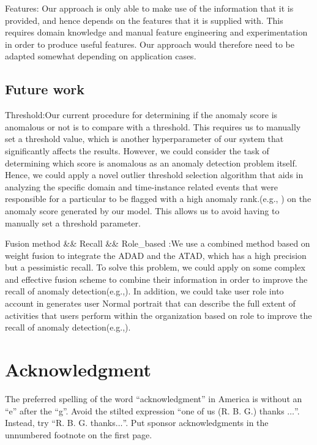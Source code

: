 \documentclass[conference]{IEEEtran}
\begin{document}
Features: Our approach is only able to make use of the information that it is provided, and hence depends on the features that it is supplied with. This requires domain knowledge and manual feature engineering and experimentation in order to produce useful features. Our approach would therefore need to be adapted somewhat depending on application cases.


\subsection{Future work} 
Threshold:Our current procedure for determining if the anomaly score is anomalous or not is to compare with a threshold. This requires us to manually set a threshold value, which is another hyperparameter of our system that significantly affects the results. However, we could consider the task of determining which score is anomalous as an anomaly detection problem itself. Hence, we could apply a novel outlier threshold selection algorithm that aids in analyzing the specific domain and time-instance related events that were responsible for a particular to be flagged with a high anomaly rank.(e.g., \cite{b49}) on the anomaly score generated by our model. This allows us to avoid having to manually set a threshold parameter.

Fusion method \&\& Recall \&\& Role\_based	:We use a combined method based on weight fusion to integrate the ADAD and the ATAD, which has a high precision but a pessimistic recall. To solve this problem, we could apply on some complex and effective fusion scheme to combine their information in order to improve the recall of anomaly detection(e.g.,\cite{b49}).  In addition, we could take user role into account in generates user Normal portrait that can describe the full extent of activities that users perform within the organization based on role to improve the recall of anomaly detection(e.g.,\cite{b50}).   	
\fi

\section*{Acknowledgment}

The preferred spelling of the word ``acknowledgment'' in America is without 
an ``e'' after the ``g''. Avoid the stilted expression ``one of us (R. B. 
G.) thanks $\ldots$''. Instead, try ``R. B. G. thanks$\ldots$''. Put sponsor 
acknowledgments in the unnumbered footnote on the first page.
\end{document}
